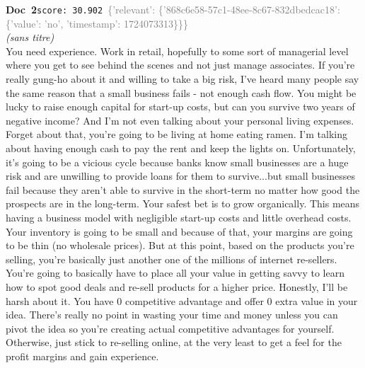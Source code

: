 \documentclass[a4paper,11pt]{article}
\begin{document}
\begin{docenv}
{\footnotesize\textcolor{doccolor}{\textbf{Doc~2}}}\hfill{\tiny\texttt{score:~30.902}}\ {\tiny\textcolor{gray}{\{'relevant': \{'868c6e58-57c1-48ee-8c67-832dbedcac18': \{'value': 'no', 'timestamp': 1724073313\}\}\}}}\\[3pt]
{\small\textit{(sans titre)}}\\[2pt]
\vspace{2pt}
{\footnotesize 
You need experience. Work in retail, hopefully to some sort of managerial level where you get to see behind the scenes and not just manage associates.  If you're really gung-ho about it and willing to take a big risk, I've heard many people say the same reason that a small business fails - not enough cash flow. You might be lucky to raise enough capital for start-up costs, but can you survive two years of negative income? And I'm not even talking about your personal living expenses. Forget about that, you're going to be living at home eating ramen. I'm talking about having enough cash to pay the rent and keep the lights on. Unfortunately, it's going to be a vicious cycle because banks know small businesses are a huge risk and are unwilling to provide loans for them to survive...but small businesses fail because they aren't able to survive in the short-term no matter how good the prospects are in the long-term.   Your safest bet is to grow organically. This means having a business model with negligible start-up costs and little overhead costs. Your inventory is going to be small and because of that, your margins are going to be thin (no wholesale prices). But at this point, based on the products you're selling, you're basically just another one of the millions of internet re-sellers. You're going to basically have to place all your value in getting savvy to learn how to spot good deals and re-sell products for a higher price.   Honestly, I'll be harsh about it. You have 0 competitive advantage and offer 0 extra value in your idea. There's really no point in wasting your time and money unless you can pivot the idea so you're creating actual competitive advantages for yourself. Otherwise, just stick to re-selling online, at the very least to get a feel for the profit margins and gain experience.}
\end{docenv}
\end{document}
